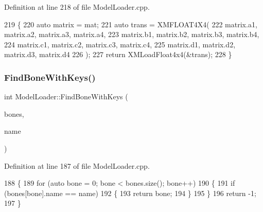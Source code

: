 Definition at line 218 of file Model\+Loader.\+cpp.


\begin{DoxyCode}
219 \{
220     \textcolor{keyword}{auto} matrix = mat;
221     \textcolor{keyword}{auto} trans = XMFLOAT4X4(
222         matrix.a1, matrix.a2, matrix.a3, matrix.a4,
223         matrix.b1, matrix.b2, matrix.b3, matrix.b4,
224         matrix.c1, matrix.c2, matrix.c3, matrix.c4,
225         matrix.d1, matrix.d2, matrix.d3, matrix.d4
226     );
227     \textcolor{keywordflow}{return} XMLoadFloat4x4(&trans);
228 \}
\end{DoxyCode}
\mbox{\label{class_model_loader_a5356ad9c0e77c4b5142c1c1400b01048}} 
\subsubsection{\texorpdfstring{Find\+Bone\+With\+Keys()}{FindBoneWithKeys()}}
{\footnotesize\ttfamily int Model\+Loader\+::\+Find\+Bone\+With\+Keys (\begin{DoxyParamCaption}\item[{std\+::vector$<$ \mbox{\hyperlink{struct_structures_1_1_anim_bone}{Structures\+::\+Anim\+Bone}} $>$}]{bones,  }\item[{std\+::string}]{name }\end{DoxyParamCaption})\hspace{0.3cm}{\ttfamily [private]}}



Definition at line 187 of file Model\+Loader.\+cpp.


\begin{DoxyCode}
188 \{
189     \textcolor{keywordflow}{for} (\textcolor{keyword}{auto} bone = 0; bone < bones.size(); bone++)
190     \{
191         \textcolor{keywordflow}{if} (bones[bone].name == name)
192         \{
193             \textcolor{keywordflow}{return} bone;
194         \}
195     \}
196     \textcolor{keywordflow}{return} -1;
197 \}
\end{DoxyCode}
\mbox{\label{class_model_loader_afabe255fd413f08ac9939e786f26aee4}} 
